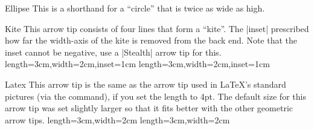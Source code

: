 \begin{arrowtipsimple}{Ellipse}
    This is a shorthand for a ``circle'' that is twice as wide as high.

    \begin{arrowexamples}
        \arrowexample[]
        \arrowexampledup[sep]
        \arrowexampledupdot[sep]
        \arrowexample[open]
        \arrowexample[length=10pt]
        \arrowexample[round]
        \arrowexample[slant=.3]
        \arrowexample[left]
        \arrowexample[right]
        \arrowexample[red]
        \arrowexample[fill=red!50]
    \end{arrowexamples}
\end{arrowtipsimple}

\begin{arrowtip}{Kite}{
    This arrow tip consists of four lines that form a ``kite''. The |inset|
    prescribed how far the width-axis of the kite is removed from the back end.
    Note that the inset cannot be negative, use a |Stealth| arrow tip for this.
}%
{length=3cm,width=2cm,inset=1cm}%
{length=3cm,width=2cm,inset=1cm}

    \begin{arrowexamples}
        \arrowexample[]
        \arrowexampledup[sep]
        \arrowexampledupdot[sep]
        \arrowexample[open]
        \arrowexample[length=6pt,width=4pt]
        \arrowexample[length=6pt,width=4pt,inset=1.5pt]
        \arrowexample[round]
        \arrowexample[slant=.3]
        \arrowexample[left]
        \arrowexample[right]
        \arrowexample[red]
    \end{arrowexamples}
\end{arrowtip}

\begin{arrowtip}{Latex}{
    This arrow tip is the same as the arrow tip used in \LaTeX's standard
    pictures (via the \texttt{\string\vec} command), if you set the length to
    4pt. The default size for this arrow tip was set slightly larger so that it
    fits better with the other geometric arrow tips.
}%
{length=3cm,width=2cm}%
{length=3cm,width=2cm}

    \begin{arrowexamples}
        \arrowexample[]
        \arrowexampledup[sep]
        \arrowexampledupdot[sep]
        \arrowexample[open]
        \arrowexample[length=4pt]
        \arrowexample[round]
        \arrowexample[slant=.3]
        \arrowexample[left]
        \arrowexample[right]
        \arrowexample[red]
    \end{arrowexamples}
\end{arrowtip}

